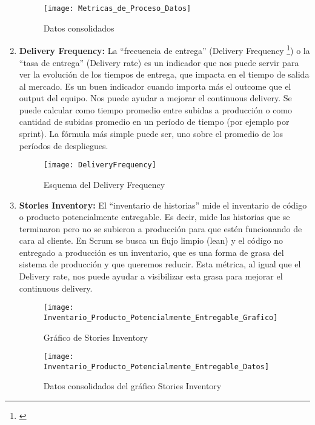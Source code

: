 \begin{enumerate}
  \begin{figure}[h]
  \centering
  \texttt{[image: Metricas\_de\_Proceso\_Datos]}
  \caption{Datos consolidados}
  \centering
  \label{fig:Metricas_de_Proceso_Datos} %
  \end{figure}
  \FloatBarrier

\item {\textbf{Delivery Frequency:} La “frecuencia de entrega” (Delivery Frequency \footnote{\cite{Humble-2018}}) o la “tasa de entrega” (Delivery rate) es un indicador que nos puede servir para ver la evolución de los tiempos de entrega, que impacta en el tiempo de salida al mercado. Es un buen indicador cuando importa más el outcome que el output del equipo. Nos puede ayudar a mejorar el continuous delivery. Se puede calcular como tiempo promedio entre subidas a producción o como cantidad de subidas promedio en un período de tiempo (por ejemplo por sprint). La fórmula más simple puede ser, uno sobre el promedio de los períodos de despliegues.
}

  \begin{figure}[h]
  \centering
  \texttt{[image: DeliveryFrequency]}
  \caption{Esquema del Delivery Frequency}
  \centering
  \label{fig:DeliveryFrequency} %
  \end{figure}
  \FloatBarrier
  
\item {\textbf{Stories Inventory:} El “inventario de historias” mide el inventario de código o producto potencialmente entregable. Es decir, mide las historias que se terminaron pero no se subieron a producción para que estén funcionando de cara al cliente. En Scrum se busca un flujo limpio (lean) y el código no entregado a producción es un inventario, que es una forma de grasa del sistema de producción y que queremos reducir. Esta métrica, al igual que el Delivery rate, nos puede ayudar a visibilizar esta grasa para mejorar el continuous delivery.
}

  \begin{figure}[h]
  \centering
  \texttt{[image: Inventario\_Producto\_Potencialmente\_Entregable\_Grafico]}
  \caption{Gráfico de Stories Inventory}
  \centering
  \label{fig:Inventario_Producto_Potencialmente_Entregable_Grafico} %
  \end{figure}
  \FloatBarrier

  \begin{figure}[h]
  \centering
  \texttt{[image: Inventario\_Producto\_Potencialmente\_Entregable\_Datos]}
  \caption{Datos consolidados del gráfico Stories Inventory}
  \centering
  \label{fig:Inventario_Producto_Potencialmente_Entregable_Datos} %
  \end{figure}
  \FloatBarrier



\end{enumerate}
